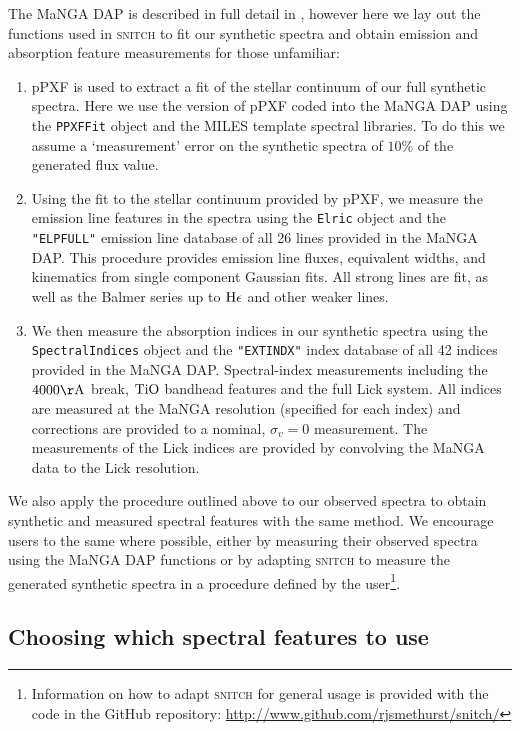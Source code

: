 \documentclass[useAMS,usenatbib]{mn2e}
\begin{document}
The MaNGA DAP is described in full detail in \cite{westfall18}, however here we lay out the functions used in \textsc{snitch} to fit our synthetic spectra and obtain emission and absorption feature measurements for those unfamiliar:

\begin{enumerate}
\item pPXF \citep{cappellari04} is used to extract a fit of the stellar continuum of our full synthetic spectra. Here we use the version of pPXF coded into the MaNGA DAP using the \texttt{PPXFFit} object and the MILES template spectral libraries. To do this we assume a `measurement' error on the synthetic spectra of $10\%$ of the generated flux value. 
\item Using the fit to the stellar continuum provided by pPXF, we measure the emission line features in the spectra using the \texttt{Elric} object and the \texttt{"ELPFULL"} emission line database of all 26 lines provided in the MaNGA DAP. This procedure provides emission line fluxes, equivalent widths, and kinematics from single component Gaussian fits. All strong lines are fit, as well as the Balmer series up to $\rm{H}\epsilon$ and other weaker lines. 
\item We then measure the absorption indices in our synthetic spectra using the \texttt{SpectralIndices} object and the \texttt{"EXTINDX"} index database of all 42 indices provided in the MaNGA DAP. Spectral-index measurements including the $4000\rm{\AA}$ break, $\rm{TiO}$ bandhead features and the full Lick system. All indices are measured at the MaNGA resolution (specified for each index) and corrections are provided to a nominal, $\sigma_v = 0$ measurement. The measurements of the Lick indices are provided by convolving the MaNGA data to the Lick resolution. 
\end{enumerate}

We also apply the procedure outlined above to our observed spectra to obtain synthetic and measured spectral features with the same method. We encourage users to the same where possible, either by measuring their observed spectra using the MaNGA DAP functions or by adapting \textsc{snitch} to measure the generated synthetic spectra in a procedure defined by the user\footnote{Information on how to adapt \textsc{snitch} for general usage is provided with the code in the GitHub repository: \url{http://www.github.com/rjsmethurst/snitch/}}.

\subsection{Choosing which spectral features to use}\label{sec:choosespf}
\end{document}
